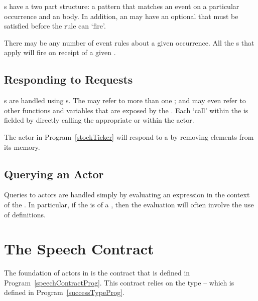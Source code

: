 s have a two part structure: a pattern that matches an event on a particular occurrence and an  body. In addition, an  may have an optional  that must be satisfied before the rule can `fire'.

There may be any number of event rules about a given occurrence. All the s that apply will fire on receipt of a given .


\subsection{Responding to Requests}
\label{requestResponse}

s are handled using s. The  may refer to more than one ; and may even refer to other functions and variables that are exposed by the . Each `call' within the  is fielded by directly calling the appropriate  or  within the actor.


The  actor in Program~\vref{stockTicker} will respond to a   by removing elements from its memory.


\subsection{Querying an Actor}
\label{actorQuery}

Queries to actors are handled simply by evaluating an expression in the context of the . In particular, if the  is of a , then the evaluation will often involve the use of  definitions.

\section{The Speech Contract}
\label{speechContract}
The foundation of actors in \Sr is the  contract that is defined in Program~\vref{speechContractProg}. This contract relies on the  type -- which is defined in Program~\vref{successTypeProg}.

